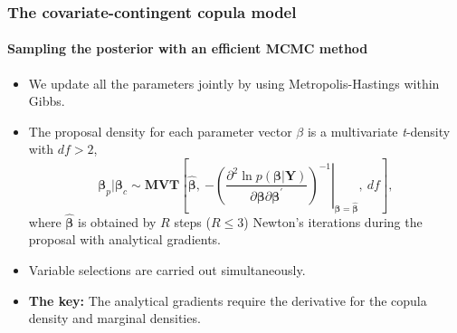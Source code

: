 \documentclass{beamer}
\begin{document}
\begin{frame}
  \frametitle{The covariate-contingent copula model}
  \framesubtitle{Sampling the posterior with an efficient MCMC method}
  \begin{itemize}
  \item We update all the parameters jointly by using
    Metropolis-Hastings within Gibbs.
  \item The proposal density for each parameter vector $\beta$ is a multivariate \emph{t}-density with  $df>2$,
    \[
    \bm{\beta}_{p} |\bm{\beta}_{c}\sim\bm{MVT}\left[\bm{\hat{\beta}},~\left.-\left(\frac{\partial^{2}\ln
            p(\bm{\beta}|\bm{Y})}{\partial\bm{\beta}\partial\bm{\beta}^{\prime}}\right)^{-1}\right\vert
      _{\bm{\beta}=\bm{\hat{\beta}}},~df\right],
    \]
    where $\bm{\hat{\beta}}$ is obtained by $R$ steps ($R\leq 3$) Newton's
    iterations during the proposal with analytical gradients.

  \item Variable selections are carried out simultaneously.

  \item \textbf{The key:} The analytical gradients require the derivative for
    the copula density and marginal densities.


  \end{itemize}
\end{frame}




\end{document}
